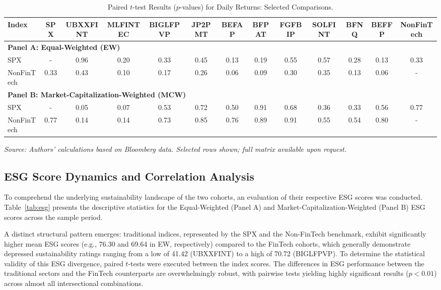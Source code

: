 \documentclass[12pt]{article}
\begin{document}
\begin{table}[htbp]
\centering
\caption{Paired $t$-test Results ($p$-values) for Daily Returns: Selected Comparisons.}\label{tab:ttest}
\begin{adjustbox}{max width=\textwidth}
\begin{tabular}{lcccccccccccc}
\toprule
Index & SPX & UBXXFINT & MLFINTEC & BIGLFPVP & JP2PMT & BEFAP & BFPAT & FGFBIP & SOLFINT & BFNQ & BEFFP & NonFinTech \\
\midrule
\multicolumn{13}{l}{\textbf{Panel A: Equal-Weighted (EW)}} \\
\midrule
SPX & - & 0.96 & 0.20 & 0.33 & 0.45 & 0.13 & 0.19 & 0.55 & 0.57 & 0.28 & 0.13 & 0.33 \\
NonFinTech & 0.33 & 0.43 & 0.10 & 0.17 & 0.26 & 0.06 & 0.09 & 0.30 & 0.35 & 0.13 & 0.06 & - \\
\midrule
\multicolumn{13}{l}{\textbf{Panel B: Market-Capitalization-Weighted (MCW)}} \\
\midrule
SPX & - & 0.05 & 0.07 & 0.53 & 0.72 & 0.50 & 0.91 & 0.68 & 0.36 & 0.33 & 0.56 & 0.77 \\
NonFinTech & 0.77 & 0.14 & 0.14 & 0.73 & 0.85 & 0.76 & 0.89 & 0.91 & 0.55 & 0.54 & 0.80 & - \\
\bottomrule
\end{tabular}
\end{adjustbox}
\vspace{2pt}
{\footnotesize \textit{Source: Authors' calculations based on Bloomberg data. Selected rows shown; full matrix available upon request.}}
\end{table}

\subsection{ESG Score Dynamics and Correlation Analysis}
To comprehend the underlying sustainability landscape of the two cohorts, an evaluation of their respective ESG scores was conducted. Table~\ref{tab:esg} presents the descriptive statistics for the Equal-Weighted (Panel A) and Market-Capitalization-Weighted (Panel B) ESG scores across the sample period.

A distinct structural pattern emerges: traditional indices, represented by the SPX and the Non-FinTech benchmark, exhibit significantly higher mean ESG scores (e.g., 76.30 and 69.64 in EW, respectively) compared to the FinTech cohorts, which generally demonstrate depressed sustainability ratings ranging from a low of 41.42 (UBXXFINT) to a high of 70.72 (BIGLFPVP). To determine the statistical validity of this ESG divergence, paired $t$-tests were executed between the index scores. The differences in ESG performance between the traditional sectors and the FinTech counterparts are overwhelmingly robust, with pairwise tests yielding highly significant results ($p < 0.01$) across almost all intersectional combinations.
\end{document}
